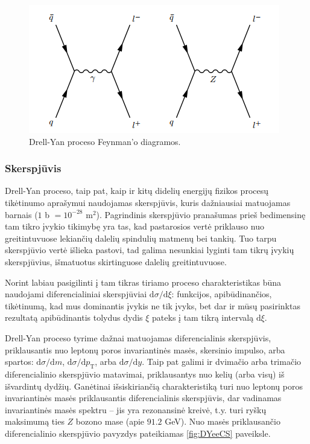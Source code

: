 \documentclass[a4paper, 12pt]{article}
\begin{document}
\begin{figure}[H]
\centering
\includegraphics[scale=0.75]{DYprocess.PNG}
\caption{Drell-Yan proceso Feynman'o diagramos.}
\label{fig:DYfeyn}
\end{figure}


\subsubsection{Skerspjūvis}

Drell-Yan proceso, taip pat, kaip ir kitų didelių energijų fizikos procesų tikėtinumo aprašymui
naudojamas skerspjūvis, kuris dažniausiai matuojamas barnais ($1$ b $= 10^{-28}$ m$^{2}$).
Pagrindinis skerspjūvio pranašumas prieš bedimensinę tam tikro įvykio tikimybę yra tas, kad
pastarosios vertė priklauso nuo greitintuvuose lekiančių dalelių spindulių matmenų bei tankių.
Tuo tarpu skerspjūvio vertė išlieka pastovi, tad galima nesunkiai lyginti tam tikrų įvykių
skerspjūvius, išmatuotus skirtinguose dalelių greitintuvuose.

Norint labiau pasigilinti į tam tikras tiriamo proceso charakteristikas būna naudojami diferencialiniai
skerspjūviai $\mathrm{d}\sigma/\mathrm{d}\xi$: funkcijos, apibūdinančios, tikėtinumą, kad mus
dominantis įvykis ne tik įvyks, bet dar ir mūsų pasirinktas rezultatą apibūdinantis tolydus
dydis $\xi$ pateks į tam tikrą intervalą $\mathrm{d}\xi$.

Drell-Yan proceso tyrime dažnai matuojamas diferencialinis skerspjūvis, priklausantis nuo
leptonų poros invariantinės masės, skersinio impulso, arba spartos:
$\mathrm{d}\sigma / \mathrm{d}m$, $\mathrm{d}\sigma / \mathrm{d}p_{\mathrm{T}}$, arba
$\mathrm{d}\sigma / \mathrm{d}y$.
Taip pat galimi ir dvimačio arba trimačio diferencialinio skerspjūvio matavimai,
priklausantys nuo kelių (arba visų) iš išvardintų dydžių.
Ganėtinai išsiskiriančią charakteristiką turi nuo leptonų poros invariantinės masės priklausantis
diferencialinis skerspjūvis, dar vadinamas invariantinės masės spektru -- jis yra rezonansinė
kreivė, t.y. turi ryškų maksimumą ties $Z$ bozono mase (apie $91.2$ GeV).
Nuo masės priklausančio diferencialinio skerspjūvio pavyzdys pateikiamas \ref{fig:DYeeCS} paveiksle.
\end{document}
